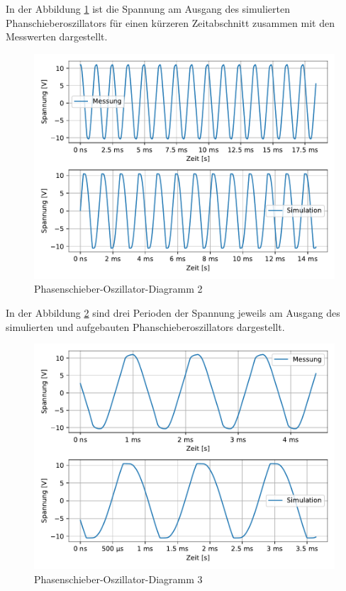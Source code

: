 In der Abbildung \ref{fig:phasenschieberozillator2} ist die Spannung am Ausgang des simulierten Phanschieberoszillators für einen kürzeren Zeitabschnitt zusammen mit den Messwerten dargestellt.


\begin{figure}[H]
  \centering
  \includegraphics[width=\linewidth]{Elektronik-Laborprotokoll_Filter/Plots/phasenschieberozillator2.pdf}
  \caption{Phasenschieber-Oszillator-Diagramm 2}
  \label{fig:phasenschieberozillator2}
\end{figure}


In der Abbildung \ref{fig:phasenschieberozillator3} sind drei Perioden der Spannung jeweils am Ausgang des simulierten und aufgebauten Phanschieberoszillators dargestellt.


\begin{figure}[H]
  \centering
  \includegraphics[width=\linewidth]{Elektronik-Laborprotokoll_Filter/Plots/phasenschieberozillator3.pdf}
  \caption{Phasenschieber-Oszillator-Diagramm 3}
  \label{fig:phasenschieberozillator3}
\end{figure}

